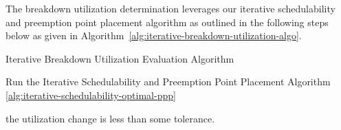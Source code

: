 The breakdown utilization determination leverages our iterative schedulability
and preemption point placement algorithm as outlined in the following steps below
as given in Algorithm~\ref{alg:iterative-breakdown-utilization-algo}.
\begin{algorithm}
\caption{Iterative Breakdown Utilization Evaluation Algorithm}
\label{alg:iterative-breakdown-utilization-algo}
\begin{algorithmic}[1]
\small
{}
\Repeat
   \State\begin{varwidth}[t]{\linewidth}
    Run the Iterative Schedulability and Preemption Point Placement Algorithm \ref{alg:iterative-schedulability-optimal-ppp} \par
    \end{varwidth}
%
%
        \State{}
    \Else
        \State{}
    \EndIf
\Until\begin{varwidth}[t]{\linewidth}
the utilization change is less than some tolerance.
\end{varwidth}
\normalsize
\end{algorithmic}
\end{algorithm}
